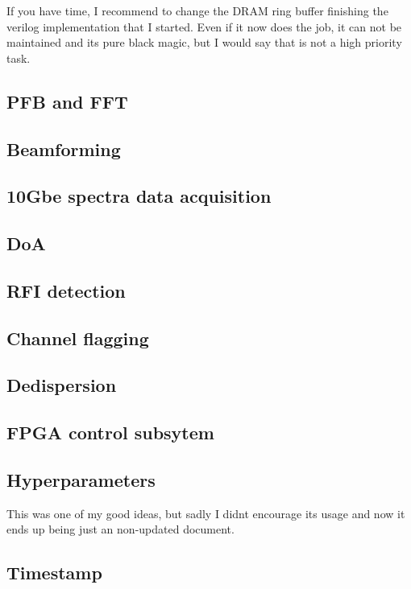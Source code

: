 If you have time, I recommend to change the DRAM ring buffer finishing the verilog implementation that I started. Even if it now does the job, it can not be maintained and its pure black magic, but I would say that is not a high priority task.















\subsection{PFB and FFT}

\subsection{Beamforming}

\subsection{10Gbe spectra data acquisition}

\subsection{DoA}

\subsection{RFI detection}

\subsection{Channel flagging}

\subsection{Dedispersion}

\subsection{FPGA control subsytem}

\subsection{Hyperparameters}



This was one of my good ideas, but sadly I didnt encourage its usage and now it ends up being just an non-updated document. 



\subsection{Timestamp}





